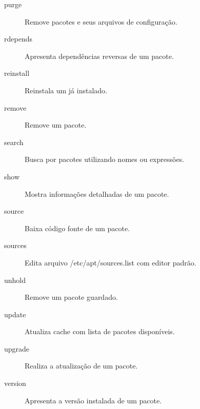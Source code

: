 \begin{description}
	\item[purge] Remove pacotes e seus arquivos de configuração. %
	\item[rdepends] Apresenta dependências reversas de um pacote. %
	\item[reinstall] Reinstala um já instalado. %
	\item[remove] Remove um pacote. %
	\item[search] Busca por pacotes utilizando nomes ou expressões. %
	\item[show] Mostra informações detalhadas de um pacote. %
	\item[source] Baixa código fonte de um pacote. %
	\item[sources] Edita arquivo {\code /etc/apt/sources.list} com editor padrão. %
	\item[unhold] Remove um pacote guardado. %
	\item[update] Atualiza cache com lista de pacotes disponíveis. %
	\item[upgrade] Realiza a atualização de um pacote. %
	\item[version] Apresenta a versão instalada de um pacote. %
\end{description}


